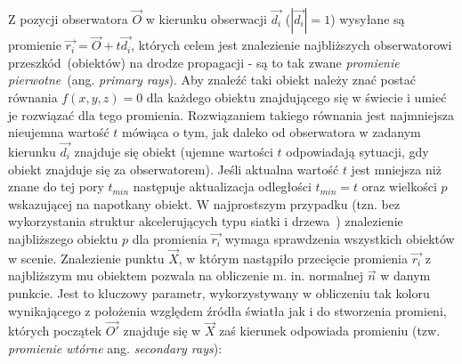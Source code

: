 Z pozycji obserwatora $\vec{O}$ w kierunku obserwacji $\vec{d_i}$ ($|\vec{d_i}| = 1$) wysyłane są promienie $\vec{r_i} = \vec{O} + t\vec{d_i}$, których celem jest znalezienie najbliższych obserwatorowi przeszkód~(obiektów) na drodze propagacji - są to tak zwane \textit{promienie pierwotne}~(ang. \textit{primary rays}). Aby znaleźć taki obiekt należy znać postać równania $f(x, y, z) = 0$ dla każdego obiektu znajdującego się w świecie i umieć je rozwiązać dla tego promienia. Rozwiązaniem takiego równania jest najmniejsza nieujemna wartość $t$ mówiąca o tym, jak daleko od obserwatora w zadanym kierunku $\vec{d_i}$ znajduje się obiekt (ujemne wartości $t$ odpowiadają sytuacji, gdy obiekt znajduje się za obserwatorem). Jeśli aktualna wartość $t$ jest mniejsza niż znane do tej pory $t_{min}$ następuje aktualizacja odległości $t_{min} = t$ oraz wielkości $p$ wskazującej na napotkany obiekt. W najprostszym przypadku (tzn. bez wykorzystania struktur akcelerujących typu siatki i drzewa~\cite{VINKLER_PHD}) znalezienie najbliższego obiektu $p$ dla promienia $\vec{r_i}$ wymaga sprawdzenia wszystkich obiektów w scenie.
Znalezienie punktu $\vec{X}$, w którym nastąpiło przecięcie promienia $\vec{r_i}$ z najbliższym mu obiektem pozwala na obliczenie m. in. normalnej $\vec{n}$ w danym punkcie. Jest to kluczowy parametr, wykorzystywany w obliczeniu tak koloru wynikającego z położenia względem źródła światła jak i do stworzenia promieni, których początek $\vec{O'}$ znajduje się w $\vec{X}$ zaś kierunek odpowiada promieniu (tzw. \textit{promienie wtórne} ang. \textit{secondary rays}):
